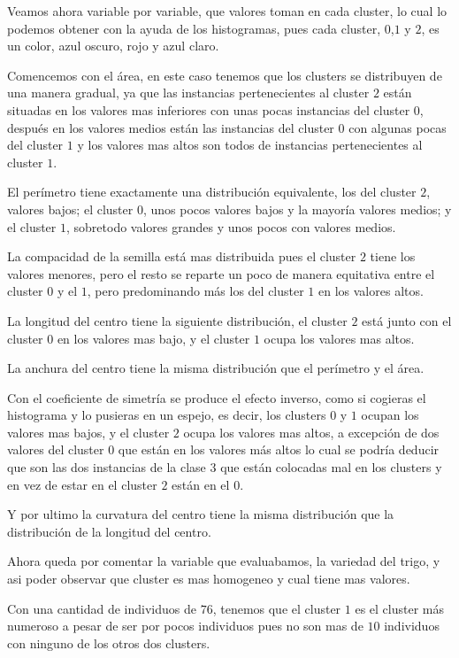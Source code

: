 \documentclass[a4paper, 11pt, twoside, openany, onecolumn, final]{memoir}
\begin{document}
Veamos ahora variable por variable, que valores toman en cada cluster, lo cual lo podemos obtener con la ayuda de los histogramas, pues cada cluster, $0$,$1$ y $2$, es un color, azul oscuro, rojo y azul claro.

	Comencemos con el área, en este caso tenemos que los clusters se distribuyen de una manera gradual, ya que las instancias pertenecientes al cluster $2$ están situadas en los valores mas inferiores con unas pocas instancias del cluster $0$, después en los valores medios están las instancias del cluster $0$ con algunas pocas del cluster $1$ y los valores mas altos son todos de instancias pertenecientes al cluster $1$.
	
	El perímetro tiene exactamente una distribución equivalente, los del cluster $2$, valores bajos; el cluster $0$, unos pocos valores bajos y la mayoría valores medios; y el cluster $1$, sobretodo valores grandes y unos pocos con valores medios.
	
	La compacidad de la semilla está mas distribuida pues el cluster $2$ tiene los valores menores, pero el resto se reparte un poco de manera equitativa entre el cluster $0$ y el $1$, pero predominando más los del cluster $1$ en los valores altos.
	
	La longitud del centro tiene la siguiente distribución, el cluster $2$ está junto con el cluster $0$ en los valores mas bajo, y el cluster $1$ ocupa los valores mas altos. 
	
	La anchura del centro tiene la misma distribución que el perímetro y el área.
	
	Con el coeficiente de simetría se produce el efecto inverso, como si cogieras el histograma y lo pusieras en un espejo, es decir, los clusters $0$ y $1$ ocupan los valores mas bajos, y el cluster $2$ ocupa los valores mas altos, a excepción de dos valores del cluster 0 que están en los valores más altos lo cual se podría deducir que son las dos instancias de la clase $3$ que están colocadas mal en los clusters y en vez de estar en el cluster $2$ están en el $0$.  
	
	Y por ultimo la curvatura del centro tiene la misma distribución que la distribución de la longitud del centro.

Ahora queda por comentar la variable que evaluabamos, la variedad del trigo, y asi poder observar que cluster es mas homogeneo y cual tiene mas valores.

Con una cantidad de individuos de $76$, tenemos que el cluster $1$ es el cluster más numeroso a pesar de ser por pocos individuos pues no son mas de $10$ individuos con ninguno de los otros dos clusters.
\end{document}

